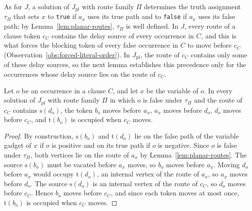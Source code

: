 \documentclass[a4paper,USenglish,thm-restate]{lipics-v2021}
\newcommand{\src}{\mathrm{s}}
\newcommand{\tgt}{\mathrm{t}}
\theoremstyle{problemstyle}
\begin{document}
As for $J$, a solution of $J_{\mathrm{pl}}$ with route family $\Pi$
determines the truth assignment $\tau_\Pi$ that sets $x$ to \texttt{true}
if $a_x$ uses its true path and to \texttt{false} if $a_x$ uses its false
path; by Lemma~\ref{lem:planar-routes}, $\tau_\Pi$ is well defined. In $J$,
every route of a clause token $c_C$ contains the delay source of every
occurrence in $C$, and this is what forces the blocking token of every false
occurrence in $C$ to move before $c_C$
(Observation~\ref{obs:forced-literal-order}). In $J_{\mathrm{pl}}$, the route
of $c_C$ contains only some of these delay sources, so the next lemma
establishes this precedence only for the occurrences whose delay source lies
on the route of $c_C$.

\begin{lemma}\label{lem:planar-precedence}
Let $o$ be an occurrence in a clause $C$, and let $x$ be the variable of
$o$. In every solution of $J_{\mathrm{pl}}$ with route family $\Pi$ in
which $o$ is false under $\tau_\Pi$ and the route of $c_C$ contains
$\src(d_o)$, the token $b_o$ moves before $a_x$, $a_x$ moves before $d_o$,
$d_o$ moves before $c_C$, and $\tgt(b_o)$ is occupied when $c_C$ moves.
\end{lemma}

\begin{proof}
By construction, $\src(b_o)$ and $\tgt(d_o)$ lie on the false path of the
variable gadget of $x$ if $o$ is positive and on its true path if $o$ is
negative. Since $o$ is false under $\tau_\Pi$, both vertices lie on the
route of $a_x$ by Lemma~\ref{lem:planar-routes}. The source $\src(b_o)$
must be vacated before $a_x$ moves, so $b_o$ moves before $a_x$. Moving
$d_o$ before $a_x$ would occupy $\tgt(d_o)$, an internal vertex of the
route of $a_x$, so $a_x$ moves before $d_o$. The source $\src(d_o)$ is an
internal vertex of the route of $c_C$, so $d_o$ moves before $c_C$. Hence
$b_o$ moves before $c_C$, and since each token moves at most once,
$\tgt(b_o)$ is occupied when $c_C$ moves.
\end{proof}

\uniqueMatchingPlanarHardness*
\end{document}
